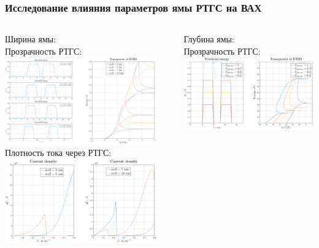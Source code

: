 \documentclass[10pt,pdf,hyperref={unicode},aspectratio={169}]{beamer}
\begin{document}
\begin{frame}
	\frametitle{Исследование влияния параметров ямы РТГС на ВАХ}
	\begin{columns}
		{\color{blue} Ширина ямы:}\\
		{\color{red} Прозрачность РТГС:}
	   	\includegraphics[width=.88\linewidth,center]{assets/qwwt}\\
		{\color{red} Плотность тока через РТГС:}
	   	\includegraphics[width=.88\linewidth,center]{assets/qwwj}
		\rule[-55mm]{0.2ex}{75mm}
		{\color{blue} Глубина ямы:}\\
		{\color{red}\small Прозрачность РТГС:}\\
	   	\includegraphics[width=.88\linewidth,center]{assets/qwt}\\

\end{columns}
\end{frame}
\end{document}
